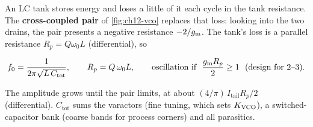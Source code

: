 An LC tank stores energy and loses a little of it each cycle in the tank resistance. The \textbf{cross-coupled pair} of \cref{fig:ch12-vco} replaces that loss: looking into the two drains, the pair presents a negative resistance $-2/g_\mathrm{m}$. The tank's loss is a parallel resistance $R_p = Q\omega_0 L$ (differential), so
\begin{keyeq}
\begin{equation}
  f_0 = \frac{1}{2\pi\sqrt{L\,C_\mathrm{tot}}}, \qquad
  R_p = Q\,\omega_0 L, \qquad
  \text{oscillation if}\ \ \frac{g_\mathrm{m} R_p}{2} \ge 1 \ \ (\text{design for 2--3}).
  \label{eq:ch12-lc}
\end{equation}
\end{keyeq}
The amplitude grows until the pair limits, at about $(4/\pi)\,I_\mathrm{tail}R_p/2$ (differential). $C_\mathrm{tot}$ sums the varactors (fine tuning, which sets $K_\mathrm{VCO}$), a switched-capacitor bank (coarse bands for process corners) and all parasitics.

